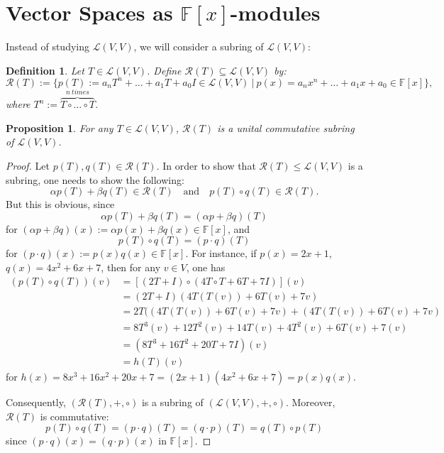 \documentclass[12pt]{amsbook}
\newtheorem{definition}[theorem]{Definition}
\newtheorem{proposition}[theorem]{Proposition}
\begin{document}
\section{Vector Spaces as $\mathbb{F}[x]$-modules}
Instead of studying $\mathcal{L}(V,V)$, we will consider a subring of $\mathcal{L}(V,V)$:
\begin{definition}
    Let $T \in \mathcal{L}(V,V)$. Define $\mathcal{R}(T) \subseteq \mathcal{L}(V,V)$ by:
$$\mathcal{R}(T) := \{ p(T) := a_n T^n + \dots + a_1 T + a_0 I \in \mathcal{L}(V,V)\ |\ p(x) = a_n x^n + \dots + a_1 x + a_0 \in \mathbb{F}[x]\},$$
where $T^n := \overbrace{T \circ \dots \circ T}^{n\ times}$.
\end{definition}

\begin{proposition} \label{prop-subring}
    For any $T \in \mathcal{L}(V,V)$, $\mathcal{R}(T)$ is a unital commutative subring of $\mathcal{L}(V,V)$.
\end{proposition}
\begin{proof}
    Let $p(T), q(T) \in \mathcal{R}(T)$. In order to show that $\mathcal{R}(T) \leq \mathcal{L}(V,V)$ is a subring, one needs to show the following:
    $$\alpha p(T) + \beta q(T) \in \mathcal{R}(T) \quad \text{and} \quad p(T) \circ q(T) \in \mathcal{R}(T).$$
    But this is obvious, since 
    $$\alpha p(T) + \beta q(T) = (\alpha p + \beta q)(T)$$
    for $(\alpha p + \beta q)(x) := \alpha p(x) + \beta q(x) \in \mathbb{F}[x]$, and
    $$p(T) \circ q(T) = (p \cdot q)(T)$$
    for $(p \cdot q)(x) := p(x)q(x) \in \mathbb{F}[x]$. For instance, if $p(x) = 2x + 1$, $q(x) = 4x^2 + 6x + 7$, then for any $v \in V$, one has
    \begin{align*}
    (p(T) \circ q(T))(v) &= [(2T + I) \circ (4 T\circ T + 6 T + 7I)](v) \\
    &= (2T+I)(4T(T(v)) + 6T(v) + 7v)\\
    &= 2T((4T(T(v)) + 6T(v) + 7v) + (4T(T(v)) + 6T(v) + 7v)\\
    &= 8T^3(v) + 12T^2(v) + 14T(v) + 4T^2(v) + 6T(v) + 7(v)\\
    &= (8T^3 + 16T^2 + 20T + 7I)(v)\\
    &= h(T)(v)
    \end{align*}
    for $h(x) = 8x^3 + 16x^2 + 20x + 7 = (2x+1)(4x^2 + 6x+7) = p(x)q(x)$.

    Consequently, $(\mathcal{R}(T), +, \circ)$ is a subring of $(\mathcal{L}(V,V), +, \circ)$. Moreover, $\mathcal{R}(T)$ is commutative:
    $$p(T) \circ q(T) = (p\cdot q)(T) = (q \cdot p)(T) = q(T) \circ p(T)$$
    since $(p \cdot q)(x) = (q \cdot p)(x)$ in $\mathbb{F}[x]$.
\end{proof}
\end{document}
